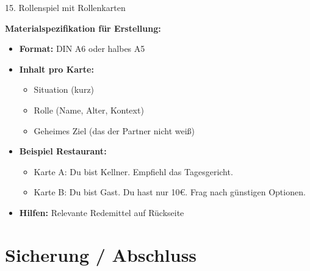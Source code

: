 \documentclass[11pt, a4paper]{article}
\begin{document}
\begin{methode}{15. Rollenspiel mit Rollenkarten}
\begin{materialbox}
\textbf{Materialspezifikation für Erstellung:}
\begin{itemize}[leftmargin=*]
    \item \textbf{Format:} DIN A6 oder halbes A5
    \item \textbf{Inhalt pro Karte:}
    \begin{itemize}
        \item Situation (kurz)
        \item Rolle (Name, Alter, Kontext)
        \item Geheimes Ziel (das der Partner nicht weiß)
    \end{itemize}
    \item \textbf{Beispiel Restaurant:}
    \begin{itemize}
        \item Karte A: Du bist Kellner. Empfiehl das Tagesgericht.
        \item Karte B: Du bist Gast. Du hast nur 10€. Frag nach günstigen Optionen.
    \end{itemize}
    \item \textbf{Hilfen:} Relevante Redemittel auf Rückseite
\end{itemize}
\end{materialbox}

\end{methode}

\newpage


\section{Sicherung / Abschluss}
\end{document}
